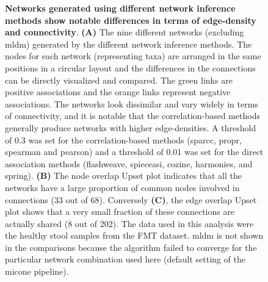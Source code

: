   \begin{figure}[H]
    \centering
    \caption{
      \textbf{Networks generated using different network inference methods show notable differences in terms of edge-density and connectivity}.
      \textbf{(A)} The nine different networks (excluding \acs{mldm}) generated by the different network inference methods.
      The nodes for each network (representing taxa) are arranged in the same positions in a circular layout and the differences in the connections can be directly visualized and compared.
      The green links are positive associations and the orange links represent negative associations.
      The networks look dissimilar and vary widely in terms of connectivity, and it is notable that the correlation-based methods generally produce networks with higher edge-densities.
      A threshold of 0.3 was set for the correlation-based methods (sparcc, propr, spearman and pearson) and a threshold of 0.01 was set for the direct association methods (flashweave, spieceasi, cozine, harmonies, and spring).
      \textbf{(B)} The node overlap Upset plot indicates that all the networks have a large proportion of common nodes involved in connections (33 out of 68).
      Conversely \textbf{(C)}, the edge overlap Upset plot shows that a very small fraction of these connections are actually shared (8 out of 202).
      The data used in this analysis were the healthy stool samples from the FMT dataset.
      \acs{mldm} is not shown in the comparisons because the algorithm failed to converge for the particular network combination used here (default setting of the \ac{micone} pipeline).
    }
    \label{fig:figure4}
  \end{figure}


